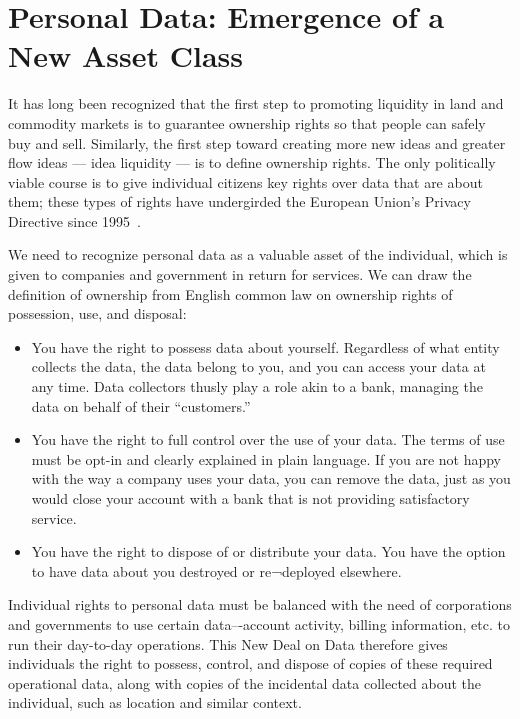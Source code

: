 \section{Personal Data: Emergence of a New Asset Class}

It has long been recognized that the first step to promoting liquidity in land and commodity markets is to guarantee ownership rights so that people can safely buy and sell.
Similarly, the first step toward creating more new ideas and greater flow ideas --- idea liquidity --- is to define ownership rights.
The only politically viable course is to give individual citizens key rights over data that are about them; these types of rights have undergirded the European Union's Privacy Directive since 1995~\cite{directive199595}.

We need to recognize personal data as a valuable asset of the individual, which is given to companies and government in return for services.
We can draw the definition of ownership from English common law on ownership rights of possession, use, and disposal:

\begin{itemize}
\item You have the right to possess data about yourself. Regardless of what entity collects the data, the data belong to you, and you can access your data at any time. Data collectors thusly play a role akin to a bank, managing the data on behalf of their “customers.”

\item You have the right to full control over the use of your data. The terms of use must be opt-in and clearly explained in plain language. If you are not happy with the way a company uses your data, you can remove the data, just as you would close your account with a bank that is not providing satisfactory service.

\item You have the right to dispose of or distribute your data. You have the option to have data about you destroyed or re¬deployed elsewhere.

\end{itemize}

Individual rights to personal data must be balanced with the need of corporations and governments to use certain data–-account activity, billing information, etc. to run their day-to-day operations.
This New Deal on Data therefore gives individuals the right to possess, control, and dispose of copies of these required operational data, along with copies of the incidental data collected about the individual, such as location and similar context.

